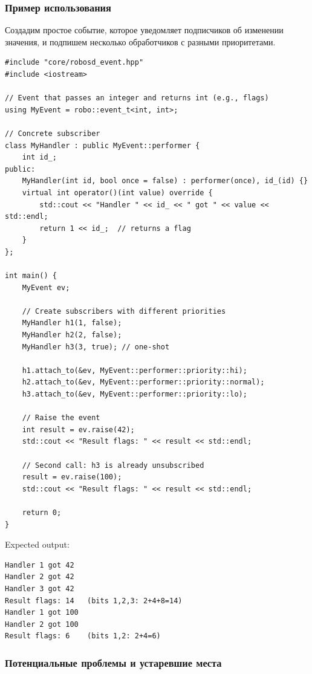 \documentclass[a4paper,12pt]{article}
\begin{document}
\subsubsection{Пример использования}

Создадим простое событие, которое уведомляет подписчиков об изменении значения, и подпишем несколько обработчиков с разными приоритетами.

\begin{lstlisting}[caption={event\_t usage example}]
#include "core/robosd_event.hpp"
#include <iostream>

// Event that passes an integer and returns int (e.g., flags)
using MyEvent = robo::event_t<int, int>;

// Concrete subscriber
class MyHandler : public MyEvent::performer {
    int id_;
public:
    MyHandler(int id, bool once = false) : performer(once), id_(id) {}
    virtual int operator()(int value) override {
        std::cout << "Handler " << id_ << " got " << value << std::endl;
        return 1 << id_;  // returns a flag
    }
};

int main() {
    MyEvent ev;

    // Create subscribers with different priorities
    MyHandler h1(1, false);
    MyHandler h2(2, false);
    MyHandler h3(3, true); // one-shot

    h1.attach_to(&ev, MyEvent::performer::priority::hi);
    h2.attach_to(&ev, MyEvent::performer::priority::normal);
    h3.attach_to(&ev, MyEvent::performer::priority::lo);

    // Raise the event
    int result = ev.raise(42);
    std::cout << "Result flags: " << result << std::endl;

    // Second call: h3 is already unsubscribed
    result = ev.raise(100);
    std::cout << "Result flags: " << result << std::endl;

    return 0;
}
\end{lstlisting}

Expected output:
\begin{verbatim}
Handler 1 got 42
Handler 2 got 42
Handler 3 got 42
Result flags: 14   (bits 1,2,3: 2+4+8=14)
Handler 1 got 100
Handler 2 got 100
Result flags: 6    (bits 1,2: 2+4=6)
\end{verbatim}

\subsubsection{Потенциальные проблемы и устаревшие места}
\end{document}

